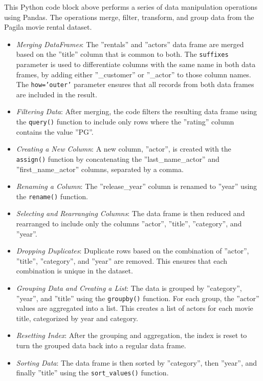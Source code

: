 This Python code block above performs a series of data manipulation operations using Pandas. The operations merge, filter, transform, and group data from the Pagila movie rental dataset.

\begin{itemize}

\item \emph{Merging DataFrames}: The ''rentals'' and ''actors'' data frame are merged based on the ''title'' column that is common to both. The \texttt{suffixes} parameter is used to differentiate columns with the same name in both data frames, by adding either ''\_customer'' or ''\_actor'' to those column names. The \texttt{how='outer'} parameter ensures that all records from both data frames are included in the result.
\item \emph{Filtering Data}: After merging, the code filters the resulting data frame using the \texttt{query()} function to include only rows where the ''rating'' column contains the value ''PG''.
\item \emph{Creating a New Column}: A new column, ''actor'', is created with the \texttt{assign()} function by concatenating the ''last\_name\_actor'' and ''first\_name\_actor'' columns, separated by a comma.
\item \emph{Renaming a Column}: The ''release\_year'' column is renamed to ''year'' using the \texttt{rename()} function.
\item \emph{Selecting and Rearranging Columns}: The data frame is then reduced and rearranged to include only the columns ''actor'', ''title'', ''category'', and ''year''.
\item \emph{Dropping Duplicates}: Duplicate rows based on the combination of ''actor'', ''title'', ''category'', and ''year'' are removed. This ensures that each combination is unique in the dataset.
\item \emph{Grouping Data and Creating a List}: The data is grouped by ''category'', ''year'', and ''title'' using the \texttt{groupby()} function. For each group, the ''actor'' values are aggregated into a list. This creates a list of actors for each movie title, categorized by year and category.
\item \emph{Resetting Index}: After the grouping and aggregation, the index is reset to turn the grouped data back into a regular data frame.
\item \emph{Sorting Data}: The data frame is then sorted by ''category'', then ''year'', and finally ''title'' using the \texttt{sort\_values()} function.
\end{itemize}

